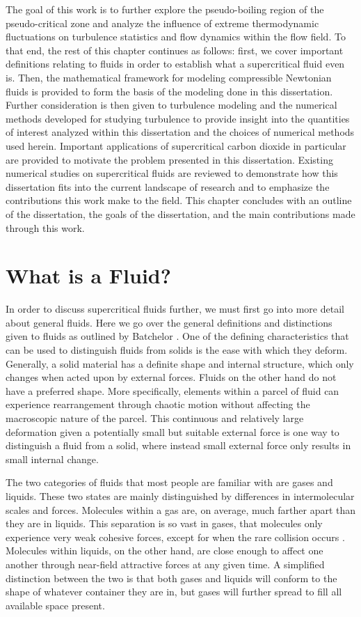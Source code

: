 The goal of this work is to further explore the pseudo-boiling region of the pseudo-critical zone and analyze the influence of extreme thermodynamic fluctuations on turbulence statistics and flow dynamics within the flow field. To that end, the rest of this chapter continues as follows: first, we cover important definitions relating to fluids in order to establish what a supercritical fluid even is. Then, the mathematical framework for modeling compressible Newtonian fluids is provided to form the basis of the modeling done in this dissertation. Further consideration is then given to turbulence modeling and the numerical methods developed for studying turbulence to provide insight into the quantities of interest analyzed within this dissertation and the choices of numerical methods used herein. Important applications of supercritical carbon dioxide in particular are provided to motivate the problem presented in this dissertation. Existing numerical studies on supercritical fluids are reviewed to demonstrate how this dissertation fits into the current landscape of research and to emphasize the contributions this work make to the field. This chapter concludes with an outline of the dissertation, the goals of the dissertation, and the main contributions made through this work. 

\section{What is a Fluid?} 

In order to discuss supercritical fluids further, we must first go into more detail about general fluids. Here we go over the general definitions and distinctions given to fluids as outlined by Batchelor \cite{batchelor_2000}. One of the defining characteristics that can be used to distinguish fluids from solids is the ease with which they deform. Generally, a solid material has a definite shape and internal structure, which only changes when acted upon by external forces. Fluids on the other hand do not have a preferred shape. More specifically, elements within a parcel of fluid can experience rearrangement through chaotic motion without affecting the macroscopic nature of the parcel. This continuous and relatively large deformation given a potentially small but suitable external force is one way to distinguish a fluid from a solid, where instead small external force only results in small internal change. 

The two categories of fluids that most people are familiar with are gases and liquids. These two states are mainly distinguished by differences in intermolecular scales and forces. Molecules within a gas are, on average, much farther apart than they are in liquids. This separation is so vast in gases, that molecules only experience very weak cohesive forces, except for when the rare collision occurs \cite{batchelor_2000}. Molecules within liquids, on the other hand, are close enough to affect one another through near-field attractive forces at any given time. A simplified distinction between the two is that both gases and liquids will conform to the shape of whatever container they are in, but gases will further spread to fill all available space present. 

